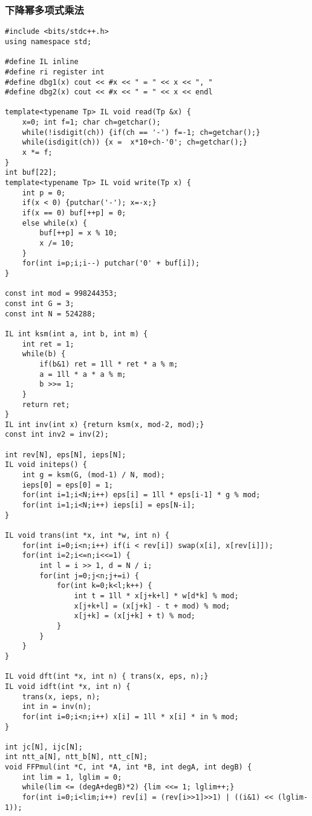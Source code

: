 \documentclass[UTF8]{ctexart}
\begin{document}
\subsubsection{下降幂多项式乘法}
\begin{framed}
\begin{lstlisting}
#include <bits/stdc++.h>
using namespace std;

#define IL inline
#define ri register int 
#define dbg1(x) cout << #x << " = " << x << ", "
#define dbg2(x) cout << #x << " = " << x << endl

template<typename Tp> IL void read(Tp &x) {
    x=0; int f=1; char ch=getchar();
    while(!isdigit(ch)) {if(ch == '-') f=-1; ch=getchar();}
    while(isdigit(ch)) {x =  x*10+ch-'0'; ch=getchar();}
    x *= f;
}
int buf[22];
template<typename Tp> IL void write(Tp x) {
    int p = 0;
    if(x < 0) {putchar('-'); x=-x;}
    if(x == 0) buf[++p] = 0;
    else while(x) {
        buf[++p] = x % 10;
        x /= 10;
    }
    for(int i=p;i;i--) putchar('0' + buf[i]);
}

const int mod = 998244353;
const int G = 3;
const int N = 524288;

IL int ksm(int a, int b, int m) {
    int ret = 1;
    while(b) {
        if(b&1) ret = 1ll * ret * a % m;
        a = 1ll * a * a % m;
        b >>= 1;
    }
    return ret;
}
IL int inv(int x) {return ksm(x, mod-2, mod);}
const int inv2 = inv(2);

int rev[N], eps[N], ieps[N];
IL void initeps() {
    int g = ksm(G, (mod-1) / N, mod);
    ieps[0] = eps[0] = 1;
    for(int i=1;i<N;i++) eps[i] = 1ll * eps[i-1] * g % mod;
    for(int i=1;i<N;i++) ieps[i] = eps[N-i];
}

IL void trans(int *x, int *w, int n) {
    for(int i=0;i<n;i++) if(i < rev[i]) swap(x[i], x[rev[i]]);
    for(int i=2;i<=n;i<<=1) {
        int l = i >> 1, d = N / i;
        for(int j=0;j<n;j+=i) {
            for(int k=0;k<l;k++) {
                int t = 1ll * x[j+k+l] * w[d*k] % mod;
                x[j+k+l] = (x[j+k] - t + mod) % mod;
                x[j+k] = (x[j+k] + t) % mod;
            }
        }
    }
}

IL void dft(int *x, int n) { trans(x, eps, n);}
IL void idft(int *x, int n) { 
    trans(x, ieps, n);
    int in = inv(n);
    for(int i=0;i<n;i++) x[i] = 1ll * x[i] * in % mod;
}

int jc[N], ijc[N];
int ntt_a[N], ntt_b[N], ntt_c[N];
void FFPmul(int *C, int *A, int *B, int degA, int degB) {
    int lim = 1, lglim = 0;
    while(lim <= (degA+degB)*2) {lim <<= 1; lglim++;}
    for(int i=0;i<lim;i++) rev[i] = (rev[i>>1]>>1) | ((i&1) << (lglim-1));


\end{lstlisting}
\end{framed}
\end{document}
